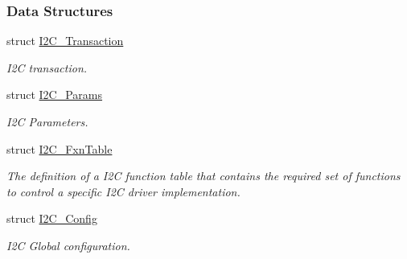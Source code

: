 \subsubsection*{Data Structures}
\begin{DoxyCompactItemize}
\item 
struct \hyperlink{struct_i2_c___transaction}{I2\+C\+\_\+\+Transaction}
\begin{DoxyCompactList}\small\item\em I2\+C transaction. \end{DoxyCompactList}\item 
struct \hyperlink{struct_i2_c___params}{I2\+C\+\_\+\+Params}
\begin{DoxyCompactList}\small\item\em I2\+C Parameters. \end{DoxyCompactList}\item 
struct \hyperlink{struct_i2_c___fxn_table}{I2\+C\+\_\+\+Fxn\+Table}
\begin{DoxyCompactList}\small\item\em The definition of a I2\+C function table that contains the required set of functions to control a specific I2\+C driver implementation. \end{DoxyCompactList}\item 
struct \hyperlink{struct_i2_c___config}{I2\+C\+\_\+\+Config}
\begin{DoxyCompactList}\small\item\em I2\+C Global configuration. \end{DoxyCompactList}\end{DoxyCompactItemize}
